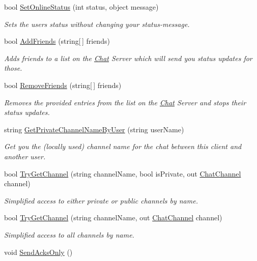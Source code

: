 \begin{DoxyCompactItemize}
bool \hyperlink{class_exit_games_1_1_client_1_1_photon_1_1_chat_1_1_chat_client_a9ae2d62c65f72f1ebea7b22ca8ce3b91}{Set\+Online\+Status} (int status, object message)
\begin{DoxyCompactList}\small\item\em Sets the user\textquotesingle{}s status without changing your status-\/message. \end{DoxyCompactList}\item 
bool \hyperlink{class_exit_games_1_1_client_1_1_photon_1_1_chat_1_1_chat_client_a66aa30bff5ca81b1a1811d8e36b09546}{Add\+Friends} (string\mbox{[}$\,$\mbox{]} friends)
\begin{DoxyCompactList}\small\item\em Adds friends to a list on the \hyperlink{namespace_exit_games_1_1_client_1_1_photon_1_1_chat}{Chat} Server which will send you status updates for those. \end{DoxyCompactList}\item 
bool \hyperlink{class_exit_games_1_1_client_1_1_photon_1_1_chat_1_1_chat_client_a8071d5a27bc1828fdcb19deee57deac2}{Remove\+Friends} (string\mbox{[}$\,$\mbox{]} friends)
\begin{DoxyCompactList}\small\item\em Removes the provided entries from the list on the \hyperlink{namespace_exit_games_1_1_client_1_1_photon_1_1_chat}{Chat} Server and stops their status updates. \end{DoxyCompactList}\item 
string \hyperlink{class_exit_games_1_1_client_1_1_photon_1_1_chat_1_1_chat_client_a24f6e608fc1b838de8de908c6756571f}{Get\+Private\+Channel\+Name\+By\+User} (string user\+Name)
\begin{DoxyCompactList}\small\item\em Get you the (locally used) channel name for the chat between this client and another user. \end{DoxyCompactList}\item 
bool \hyperlink{class_exit_games_1_1_client_1_1_photon_1_1_chat_1_1_chat_client_a518706086a60688c5dbe946e3b437491}{Try\+Get\+Channel} (string channel\+Name, bool is\+Private, out \hyperlink{class_exit_games_1_1_client_1_1_photon_1_1_chat_1_1_chat_channel}{Chat\+Channel} channel)
\begin{DoxyCompactList}\small\item\em Simplified access to either private or public channels by name. \end{DoxyCompactList}\item 
bool \hyperlink{class_exit_games_1_1_client_1_1_photon_1_1_chat_1_1_chat_client_ad48f9b88b0635c9f2363322123044fb8}{Try\+Get\+Channel} (string channel\+Name, out \hyperlink{class_exit_games_1_1_client_1_1_photon_1_1_chat_1_1_chat_channel}{Chat\+Channel} channel)
\begin{DoxyCompactList}\small\item\em Simplified access to all channels by name. \end{DoxyCompactList}\item 
void \hyperlink{class_exit_games_1_1_client_1_1_photon_1_1_chat_1_1_chat_client_a6b1cdbd8b56655e88e678441452f65a1}{Send\+Acks\+Only} ()
\end{DoxyCompactItemize}
